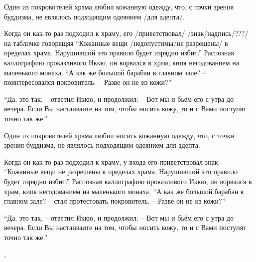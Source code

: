 \begin{ver}
Один из покровителей храма любил кожанную одежду,
что, с точки зрения буддизма, не являлось подходящим одеянием /для
адепта/. 

Когда он как-то раз подходил к храму, его /приветствовал/ /знак/надпись/???/ на табличке говорящяя ``Кожанные вещи /недопустимы/не разрешены/ в
пределах храма. Нарушивший это правило будет изрядно избит.''
Распознав каллиграфию проказливого Иккю, он ворвался в храм,
кипя негодованием на маленького монаха. ``А как же большой барабан в
главном зале? -- поинтересовался покровитель. -- Разве он не из кожи?''

``Да, это так, -- ответил Иккю, и продолжил: -- Вот мы и бьём его с
утра до вечера. Если Вы настаиваите на том, чтобы носить кожу, то и с
Вами поступят точно так же.''   
\end{ver}

\begin{ver}[1]
Один из покровителей храма любил носить кожанную одежду,
что, с точки зрения буддизма, не являлось подходящим одеянием для
адепта. 

Когда он как-то раз подходил к храму, у входа его приветствовал знак:
``Кожанные вещи не разрешены в пределах храма. Нарушивший это правило
будет изрядно избит.''  Распознав каллиграфию проказливого Иккю, он
ворвался в храм, кипя негодованием на маленького монаха. ``А как же
большой барабан в главном зале? -- стал протестовать покровитель. --
Разве он не из кожи?''

``Да, это так, -- ответил Иккю, и продолжил: -- Вот мы и бьём его с
утра до вечера. Если Вы настаиваите на том, чтобы носить кожу, то и с
Вами поступят точно так же.''
\end{ver}
\sep

